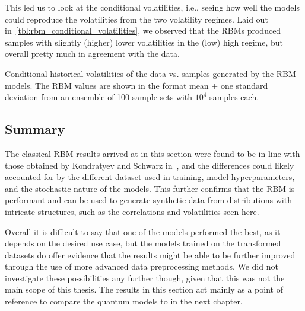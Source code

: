 This led us to look at the conditional volatilities, i.e., seeing how well the models could reproduce the volatilities from the two volatility regimes.
Laid out in~\cref{tbl:rbm_conditional_volatilities}, we observed that the RBMs produced samples with slightly (higher) lower volatilities in the (low) high regime, but overall pretty much in agreement with the data.
\begin{table}[!htb]
    \centering
    \begin{adjustbox}{max width=\textwidth}
        
    \end{adjustbox}
    \caption{Conditional historical volatilities of the data vs. samples generated by the RBM models. The RBM values are shown in the format mean \(\pm\) one standard deviation from an ensemble of 100 sample sets with \( 10^4 \) samples each.}
    \label{tbl:rbm_conditional_volatilities}
\end{table}

\subsection{Summary}
The classical RBM results arrived at in this section were found to be in line with those obtained by Kondratyev and Schwarz in~\cite{kondratyev_2019}, and the differences could likely accounted for by the different dataset used in training, model hyperparameters, and the stochastic nature of the models.
This further confirms that the RBM is performant and can be used to generate synthetic data from distributions with intricate structures, such as the correlations and volatilities seen here.

Overall it is difficult to say that one of the models performed the best, as it depends on the desired use case, but the models trained on the transformed datasets do offer evidence that the results might be able to be further improved through the use of more advanced data preprocessing methods.
We did not investigate these possibilities any further though, given that this was not the main scope of this thesis.
The results in this section act mainly as a point of reference to compare the quantum models to in the next chapter.
